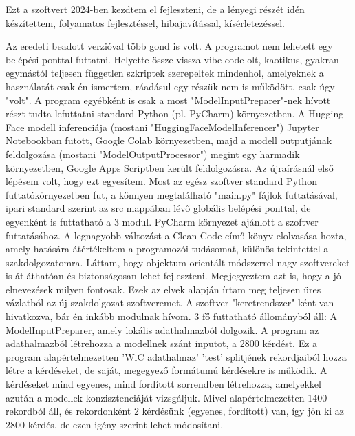 \usepackage{graphicx}\begin{Document}
                         Ezt a szoftvert 2024-ben kezdtem el fejleszteni, de a lényegi részét idén készítettem, folyamatos fejlesztéssel, hibajavítással, kísérletezéssel.


                         Az eredeti beadott verzióval több gond is volt. A programot nem lehetett egy belépési ponttal futtatni. Helyette össze-vissza vibe code-olt, kaotikus, gyakran egymástól teljesen független szkriptek szerepeltek mindenhol, amelyeknek a használatát csak én ismertem, ráadásul egy részük nem is működött, csak úgy "volt". A program egyébként is csak a most "ModelInputPreparer"-nek hívott részt tudta lefuttatni standard Python (pl. PyCharm) környezetben. A Hugging Face modell inferenciája (mostani "HuggingFaceModelInferencer") Jupyter Notebookban futott, Google Colab környezetben, majd a modell outputjának feldolgozása (mostani "ModelOutputProcessor") megint egy harmadik környezetben, Google Apps Scriptben került feldolgozásra.
                         Az újraírásnál első lépésem volt, hogy ezt egyesítem. Most az egész szoftver standard Python futtatókörnyezetben fut, a könnyen megtalálható "main.py" fájlok futtatásával, ipari standard szerint az src mappában lévő globális belépési ponttal, de egyenként is futtatható a 3 modul. PyCharm környezet ajánlott a szoftver futtatásához.
                         A legnagyobb változást a Clean Code című könyv elolvasása hozta, amely hatására átértékeltem a programozói tudásomat, különös tekintettel a szakdolgozatomra. Láttam, hogy objektum orientált módszerrel nagy szoftvereket is átláthatóan és biztonságosan lehet fejleszteni. Megjegyeztem azt is, hogy a jó elnevezések milyen fontosak. Ezek az elvek alapján írtam meg teljesen üres vázlatból az új szakdolgozat szoftveremet.
                         A szoftver "keretrendszer"-ként van hivatkozva, bár én inkább modulnak hívom. 3 fő futtatható állományból áll:
                         A ModelInputPreparer, amely lokális adathalmazból dolgozik. A program az adathalmazból létrehozza a modellnek szánt inputot, a 2800 kérdést. Ez a program alapértelmezetten 'WiC adathalmaz' 'test' splitjének rekordjaiból hozza létre a kérdéseket, de saját, megegyező formátumú kérdésekre is működik. A kérdéseket mind egyenes, mind fordított sorrendben létrehozza, amelyekkel azután a modellek konzisztenciáját vizsgáljuk. Mivel alapértelmezetten 1400 rekordból áll, és rekordonként 2 kérdésünk (egyenes, fordított) van, így jön ki az 2800 kérdés, de ezen igény szerint lehet módosítani.


\end{Document}
